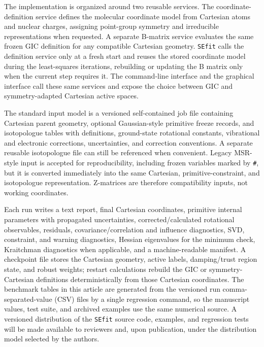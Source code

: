 \documentclass[journal=jctcce,manuscript=article,maxauthors=999]{achemso}
\begin{document}
The implementation is organized around two reusable services. The coordinate-definition service
defines the molecular coordinate model from Cartesian atoms and nuclear
charges, assigning point-group symmetry and irreducible representations when
requested. A separate B-matrix service evaluates the same frozen GIC definition
for any compatible Cartesian geometry. \texttt{SEfit} calls the definition
service only at a fresh start and reuses the stored coordinate model during the
least-squares iterations, rebuilding or updating the B matrix only when the
current step requires it. The command-line interface and the graphical
interface call these same services and expose the choice between GIC and
symmetry-adapted Cartesian active spaces.

The standard input model is a versioned self-contained job file containing
Cartesian parent geometry, optional Gaussian-style primitive freeze records,
and isotopologue tables with definitions, ground-state rotational constants,
vibrational and electronic corrections, uncertainties, and correction
conventions. A separate reusable isotopologue file can still be referenced when
convenient. Legacy MSR-style input is accepted for reproducibility, including
frozen variables marked by
\texttt{\#}, but it is converted immediately into the same Cartesian,
primitive-constraint, and isotopologue representation. Z-matrices are therefore
compatibility inputs, not working coordinates.

Each run writes a text report, final Cartesian coordinates, primitive internal
parameters with propagated uncertainties, corrected/calculated rotational
observables, residuals, covariance/correlation and influence diagnostics,
SVD, constraint, and warning diagnostics, Hessian eigenvalues for the minimum check,
Kraitchman diagnostics when applicable, and a machine-readable manifest. A
checkpoint file stores the Cartesian geometry, active labels, damping/trust
region state, and robust weights; restart calculations rebuild the GIC or
symmetry-Cartesian definitions deterministically from those Cartesian
coordinates. The benchmark tables in this article are generated from the
versioned run comma-separated-value (CSV) files by a single regression command, so the manuscript
values, test suite, and archived examples use the same numerical source. A
versioned distribution of the \texttt{SEfit} source code,
examples, and regression tests will be made available to reviewers and, upon
publication, under the distribution model selected by the authors.
\end{document}
